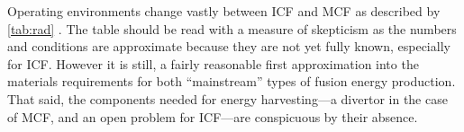 Operating environments change vastly between ICF and MCF as described by \cref{tab:rad} \cite{openv}. The table should be read with a measure of skepticism as the numbers and conditions are approximate because they are not yet fully known, especially for ICF. However it is still, a fairly reasonable first approximation into the materials requirements for both ``mainstream'' types of fusion energy production. That said, the components needed for energy harvesting---a divertor in the case of MCF, and an open problem for ICF---are conspicuous by their absence.

\begin{table}
	\centering
\end{table}
